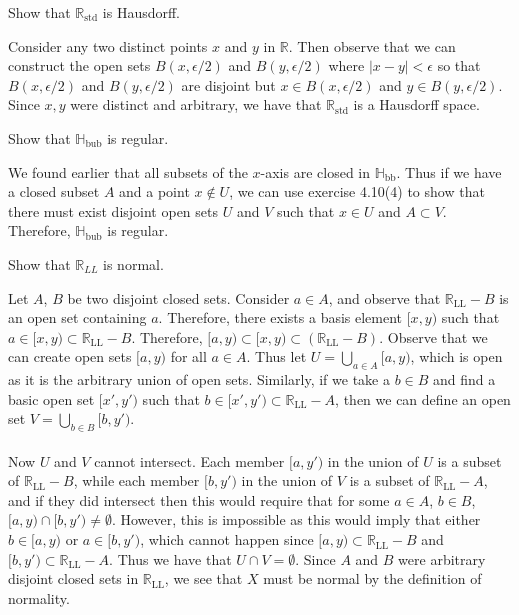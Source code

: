 \documentclass[a4paper,12pt,twoside]{hmcpset}
\begin{document}
\begin{exercise}[Exercise 5.3]
    Show that $\mathbb{R}_{\text{std}}$ is
Hausdorff. 
\end{exercise}

\begin{solution}
Consider any two distinct points $x$ and $y$ in $\mathbb{R}$. Then
observe that we can construct the open sets $B(x, \epsilon/2)$ and
$B(y, \epsilon/2)$ where $|x - y| < \epsilon$ so that $B(x, \epsilon/2)$
and $B(y, \epsilon/2)$ are disjoint but $x \in B(x, \epsilon/2)$ and
$y \in B(y, \epsilon/2)$. Since $x, y$ were distinct and arbitrary,
we have that
$\mathbb{R}_{\text{std}}$ is a Hausdorff space.
\end{solution}

\begin{exercise}[Exercise 5.4]
    Show that $\mathbb{H}_{\text{bub}}$ is regular.
\end{exercise}

\begin{solution}
    We found earlier that all subsets of the $x$-axis are closed in
$\mathbb{H}_{\text{bb}}$. Thus if we have a closed subset $A$ and a
point $x \notin U$, we can use exercise 4.10(4) to show that there
must exist disjoint open sets $U$ and $V$ such that $x \in U$ and $A
\subset V$. Therefore, $\mathbb{H}_{\text{bub}}$ is regular.
\end{solution}

\begin{exercise}[Exercise 5.5]
    Show that $\mathbb{R}_{LL}$ is normal. 
\end{exercise}

\begin{solution}
Let $A$, $B$ be two disjoint closed sets. Consider $a \in A$, and observe
that $\mathbb{R}_{\text{LL}} - B$ is an open set containing $a$. Therefore, 
there exists a basis element $[x, y)$ such that $a \in [x, y) \subset 
\mathbb{R}_{\text{LL}} - B$. Therefore, 
$[a, y) \subset [x, y) \subset (\mathbb{R}_{\text{LL}} - B)$. Observe that 
we can create open sets $[a, y)$ for all $a \in A$. Thus let 
$U = \bigcup\limits_{a \in A} [a, y)$, which is open as it is the arbitrary 
union of open sets. Similarly, if we take a $b \in B$ and find a basic open 
set $[x', y')$ such that $b \in [x', y') \subset \mathbb{R}_{\text{LL}} -
A$, then we can define an open set $V = \bigcup\limits_{b \in B}[b, y')$.
\\
\\
Now $U$ and $V$ cannot intersect. Each member $[a, y')$ in the union 
of $U$ is a subset of $\mathbb{R}_{\text{LL}} - B$, while each member 
$[b, y')$ in the union of $V$ is a subset of $\mathbb{R}_{\text{LL}} - A$, 
and if they did intersect then this would require that for some $a \in A$, 
$b \in B$, $[a, y) \cap [b, y') \ne \emptyset$. However, this is impossible
as this would imply that either $b \in [a, y)$ or $a \in [b, y')$, which 
cannot happen since $[a, y) \subset \mathbb{R}_{\text{LL}} - B$ and 
$[b, y') \subset \mathbb{R}_{\text{LL}} - A$. Thus we have that $U \cap V =
\emptyset$. Since $A$ and $B$ were arbitrary disjoint closed sets in
$\mathbb{R}_{\text{LL}}$, we see that $X$ must be normal 
by the definition of normality.
\end{solution}
\end{document}
